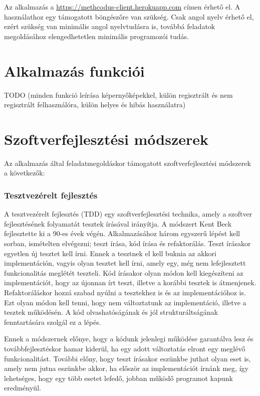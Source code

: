 \documentclass{elteikthesis}
\begin{document}
			Az alkalmazás a \url{https://methcodus-client.herokuapp.com} címen érhető el. A használathoz egy támogatott böngészőre van szükség. Csak angol nyelv érhető el, ezért szükség van minimális angol nyelvtudásra is, továbbá feladatok megoldásához elengedhetetlen minimális programozói tudás.
		
		\section{Alkalmazás funkciói}
		TODO (minden funkció leírása képernyőképekkel, külön regisztrált és nem regisztrált felhasználóra, külön helyes és hibás használatra)
		
		\section{Szoftverfejlesztési módszerek}
		Az alkalmazás által feladatmegoldáskor támogatott szoftverfejlesztési módszerek a következők:
		\subsubsection{Tesztvezérelt fejlesztés}
			A tesztvezérelt fejlesztés (TDD) \cite{tdd} egy szoftverfejlesztési technika, amely a szoftver fejlesztésének folyamatát tesztek írásával irányítja. A módszert Kent Beck fejlesztette ki a 90-es évek végén. Alkalmazásához három egyszerű lépést kell sorban, ismételten elvégezni; teszt írása, kód írása és refaktorálás. Teszt írásakor egyetlen új tesztet kell írni. Ennek a tesztnek el kell buknia az akkori implementáción, vagyis olyan tesztet kell írni, amely egy, még nem lefejlesztett funkcionalitás meglétét teszteli. Kód írásakor olyan módon kell kiegészíteni az implementációt, hogy az újonnan írt teszt, illetve a korábbi tesztek is átmenjenek. Refaktoráláskor hozzá szabad nyúlni a tesztekhez is és az implementációhoz is. Ezt olyan módon kell tenni, hogy nem változtatunk az implementáció, illetve a tesztek működésén. A kód olvashatóságának és jól strukturáltságának fenntartására szolgál ez a lépés.
			
			Ennek a módszernek előnye, hogy a kódunk jelenlegi működése garantálva lesz és továbbfejlesztéskor hamar kiderül, ha egy adott változtatás elront egy meglévő funkcionalitást. További előny, hogy teszt írásakor eszünkbe juthat olyan eset is, amely nem jutna eszünkbe akkor, ha először az implementációt írnánk meg, így lehetséges, hogy egy több esetet lefedő, jobban működő programot kapunk eredményül.
\end{document}
